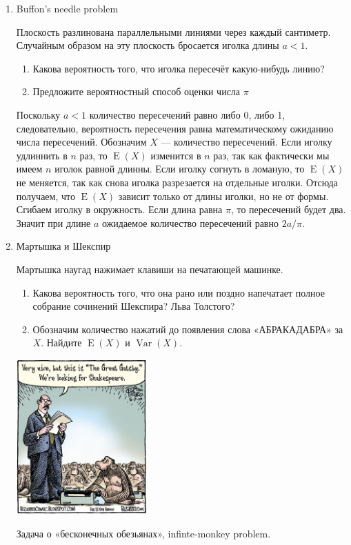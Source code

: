 \documentclass[nobib]{tufte-handout}
\DeclareMathOperator{\Var}{Var}
\DeclareMathOperator{\E}{E}
\begin{document}
\begin{enumerate}
\item Buffon's needle problem

Плоскость разлинована параллельными линиями через каждый сантиметр. Случайным образом на эту плоскость бросается иголка длины $a<1$. 

\begin{enumerate}
\item Какова вероятность того, что иголка пересечёт какую-нибудь линию?
\item Предложите вероятностный способ оценки числа $\pi$
\end{enumerate}

\begin{solution}
Поскольку $a<1$ количество пересечений равно либо 0, либо 1, следовательно, вероятность пересечения равна математическому ожиданию числа пересечений. Обозначим $X$ --- количество пересечений. Если иголку удлиннить в $n$ раз, то $\E(X)$ изменится в $n$ раз, так как фактически мы имеем $n$ иголок равной длинны. Если иголку согнуть в ломаную, то $\E(X)$ не меняется, так как снова иголка разрезается на отдельные иголки. Отсюда получаем, что $\E(X)$ зависит только от длины иголки, но не от формы. Сгибаем иголку в окружность. Если длина равна $\pi$, то пересечений будет два. Значит при длине $a$ ожидаемое количество пересечений равно $2a/\pi$. 
\end{solution}



\item Мартышка и Шекспир

Мартышка наугад нажимает клавиши на печатающей машинке. 


\begin{enumerate}
\item Какова вероятность того, что она рано или поздно напечатает полное собрание сочинений Шекспира? Льва Толстого?
\item Обозначим количество нажатий до появления слова «АБРАКАДАБРА» за $X$. Найдите $\E(X)$ и $\Var(X)$.
\end{enumerate}


\begin{marginfigure}
  \includegraphics[width=5cm]{gatsby}
  \caption{Задача о «бесконечных обезьянах», infinte-monkey problem. }
\end{marginfigure}


\end{enumerate}
\end{document}
